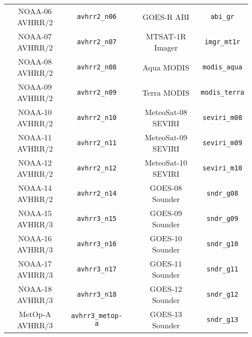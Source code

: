 \begin{table}[htp]
\begin{tabular}{c c c c c}
NOAA-06 AVHRR/2           & \texttt{avhrr2\_n06}     & \hspace{0.2cm} & GOES-R ABI                   & \texttt{abi\_gr}           \\
NOAA-07 AVHRR/2           & \texttt{avhrr2\_n07}     & \hspace{0.2cm} & MTSAT-1R Imager              & \texttt{imgr\_mt1r}        \\
NOAA-08 AVHRR/2           & \texttt{avhrr2\_n08}     & \hspace{0.2cm} & Aqua MODIS                   & \texttt{modis\_aqua}       \\
NOAA-09 AVHRR/2           & \texttt{avhrr2\_n09}     & \hspace{0.2cm} & Terra MODIS                  & \texttt{modis\_terra}      \\
NOAA-10 AVHRR/2           & \texttt{avhrr2\_n10}     & \hspace{0.2cm} & MeteoSat-08 SEVIRI           & \texttt{seviri\_m08}       \\
NOAA-11 AVHRR/2           & \texttt{avhrr2\_n11}     & \hspace{0.2cm} & MeteoSat-09 SEVIRI           & \texttt{seviri\_m09}       \\
NOAA-12 AVHRR/2           & \texttt{avhrr2\_n12}     & \hspace{0.2cm} & MeteoSat-10 SEVIRI           & \texttt{seviri\_m10}       \\
NOAA-14 AVHRR/2           & \texttt{avhrr2\_n14}     & \hspace{0.2cm} & GOES-08 Sounder              & \texttt{sndr\_g08}         \\
NOAA-15 AVHRR/3           & \texttt{avhrr3\_n15}     & \hspace{0.2cm} & GOES-09 Sounder              & \texttt{sndr\_g09}         \\
NOAA-16 AVHRR/3           & \texttt{avhrr3\_n16}     & \hspace{0.2cm} & GOES-10 Sounder              & \texttt{sndr\_g10}         \\
NOAA-17 AVHRR/3           & \texttt{avhrr3\_n17}     & \hspace{0.2cm} & GOES-11 Sounder              & \texttt{sndr\_g11}         \\
NOAA-18 AVHRR/3           & \texttt{avhrr3\_n18}     & \hspace{0.2cm} & GOES-12 Sounder              & \texttt{sndr\_g12}         \\
MetOp-A AVHRR/3           & \texttt{avhrr3\_metop-a} & \hspace{0.2cm} & GOES-13 Sounder              & \texttt{sndr\_g13}         \\

\end{tabular}
\end{table}
